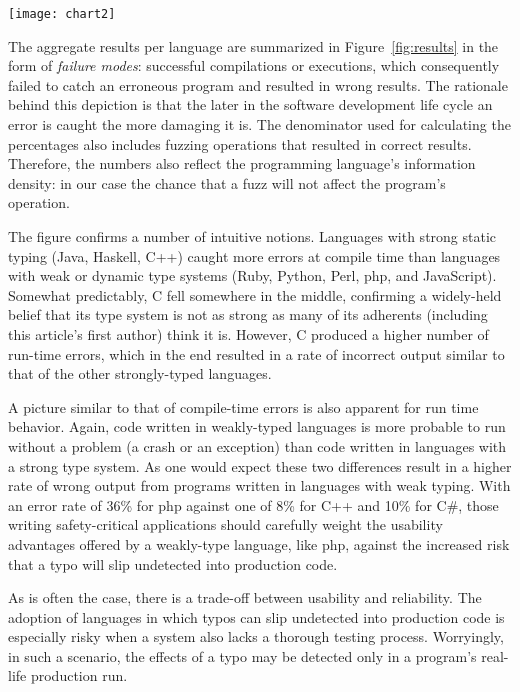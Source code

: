 \documentclass[10pt]{sigplanconf}
\begin{document}
\begin{figure*}
        \texttt{[image: chart2]}
        \caption{Failure modes for each phase per language and overall.}
        \label{fig:results}
\end{figure*}

The aggregate results per language are summarized in Figure~\ref{fig:results}
in the form of {\em failure modes}:
successful compilations or executions, which consequently failed to catch an
erroneous program and resulted in wrong results.
The rationale behind this depiction is that the later in the software
development life cycle an error is caught the more damaging it is.
The denominator used for calculating the percentages also includes
fuzzing operations that resulted in correct results.
Therefore, the numbers also reflect the programming language's
information density:
in our case the chance that a fuzz will not affect the program's operation.

The figure confirms a number of intuitive notions.
Languages with strong static typing \cite{Pie02} (Java, Haskell, C++)
caught more errors at compile time than languages
with weak or dynamic type systems
(Ruby, Python, Perl, {\sc php}, and JavaScript).
Somewhat predictably, C fell somewhere in the middle,
confirming a widely-held belief that its type system is not as strong
as many of its adherents (including this article's first author)
think it is.
However, C produced a higher number of run-time errors,
which in the end resulted in a rate of incorrect output
similar to that of the other strongly-typed languages.

A picture similar to that of compile-time errors
is also apparent for run time behavior.
Again, code written in weakly-typed languages is more probable to run without
a problem (a crash or an exception)
than code written in languages with a strong type system.
As one would expect these two differences result in a higher rate of
wrong output from programs written in languages with weak typing.
With an error rate of 36\% for {\sc php} against one of 8\% for
C++ and 10\% for C\#,
those writing safety-critical applications should carefully
weight the usability advantages offered by a weakly-type language,
like {\sc php}, against the increased risk that a typo
will slip undetected into production code.

As is often the case,
there is a trade-off between usability and reliability.
The adoption of languages in which typos can slip undetected
into production code is especially risky when a system also lacks
a thorough testing process.
Worryingly, in such a scenario, the effects of a typo may be
detected only in a program's real-life production run.
\end{document}
